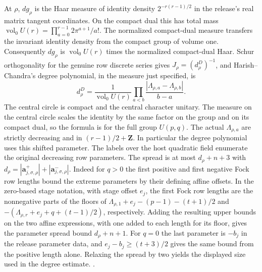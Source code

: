At \(\rho\), \(dg_\rho\) is the Haar measure of identity
density \(2^{-r(r-1)/2}\) in the release's real matrix
tangent coordinates. On the compact dual this has total
mass \(\operatorname{vol}_{0}U(r)=
\prod_{a=0}^{r-1}2\pi^{a+1}/a!\).
The normalized compact-dual measure transfers the invariant
identity density from the compact group of volume one.
Consequently \(dg_\rho\) is
\(\operatorname{vol}_{0}U(r)\) times the normalized
compact-dual Haar. Schur orthogonality for the genuine row
discrete series gives \(J_\rho=(d_\rho^D)^{-1}\), and
Harish--Chandra's degree polynomial, in the measure just
specified, is
\[
 d_\rho^D=\frac{1}{\operatorname{vol}_{0}U(r)}
        \prod_{a<b}\frac{|\Lambda_{\rho,a}-\Lambda_{\rho,b}|}{b-a}.
\]
The central circle is compact and the central character
unitary. The measure on the central circle scales the
identity by the same factor on the group and on its compact
dual, so the formula is for the full group \(U(p,q)\).
The actual \(\Lambda_{\rho,a}\) are strictly decreasing
and in \((r-1)/2+\mathbf Z\). In particular the degree
polynomial uses this shifted parameter. The labels over the
host quadratic field enumerate the original decreasing
row parameters. The spread is at most \(d_\rho+n+3\)
with \(d_\rho=|\mathbf a^+_{j,\sigma,\rho}|+
|\mathbf a^-_{j,\sigma,\rho}|\).
Indeed for \(q>0\) the first positive and first negative
Fock row lengths bound the extreme parameters by their
defining affine offsets. In the zero-based stage notation,
with stage offset \(e_j\), the first Fock row lengths are the
nonnegative parts of the floors of
\(\Lambda_{\rho,1}+e_j-(p-1)-(t+1)/2\) and
\(-(\Lambda_{\rho,r}+e_j+q+(t-1)/2)\), respectively. Adding
the resulting upper bounds on the two affine expressions,
with one added to each length for its floor, gives the
parameter spread bound \(d_\rho+n+1\).
For \(q=0\) the last parameter is \(-b_j\) in the release
parameter data, and \(e_j-b_j\ge(t+3)/2\) gives the same
bound from the positive length alone. Relaxing the spread by
two yields the displayed size used in the degree estimate.
\cite[\S41, Theorem~16]{ar4-harish-chandra}
\cite[(3.10), (3.12), Theorem~(8.1)]{ar4-atiyah-schmid}
.

